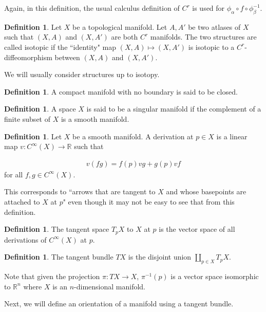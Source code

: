 \documentclass[11pt, psamsfonts]{amsart}
\theoremstyle{definition}
\newtheorem{defn}[thm]{Definition}
\theoremstyle{remark}
\numberwithin{equation}{section}
\begin{document}
Again, in this definition, the usual calculus definition of $C^r$ is used for $\phi_{\alpha} \circ f \circ \phi_{\beta}^{-1}$.

\begin{defn}
  Let $X$ be a topological manifold.
  Let $A, A'$ be two atlases of $X$ such that $(X, A)$ and $(X, A')$ are both $C^r$ manifolds.
  The two structures are called isotopic if the ``identity" map $(X, A) \mapsto (X, A')$ is isotopic to a $C^r$-diffeomorphism between $(X, A)$ and $(X, A')$.
\end{defn}

We will usually consider structures up to isotopy.

\begin{defn}
  A compact manifold with no boundary is said to be closed.
\end{defn}

\begin{defn}
  A space $X$ is said to be a singular manifold if the complement of a finite subset of $X$ is a smooth manifold.
\end{defn}


\begin{defn}
  Let $X$ be a smooth manifold.
  A derivation at $p \in X$ is a linear map $v: C^{\infty}(X) \rightarrow \mathbb{R}$ such that

  \begin{align*}
    v(fg) = f(p)vg + g(p)vf
  \end{align*}
  for all $f, g \in C^{\infty}(X)$.

  This corresponds to ``arrows that are tangent to $X$ and whose basepoints are attached to $X$ at $p$" even though it may not be easy to see that from this definition.
\end{defn}

\begin{defn}
  The tangent space $T_pX$ to $X$ at $p$ is the vector space of all derivations of $C^{\infty}(X)$ at $p$.
\end{defn}


\begin{defn}
  The tangent bundle $TX$ is the disjoint union $\coprod_{p \in X} T_pX$.
\end{defn}

Note that given the projection $\pi: TX \rightarrow X$, $\pi^{-1}(p)$ is a vector space isomorphic to $\mathbb{R}^n$ where $X$ is an $n$-dimensional manifold.

Next, we will define an orientation of a manifold using a tangent bundle.
\end{document}
